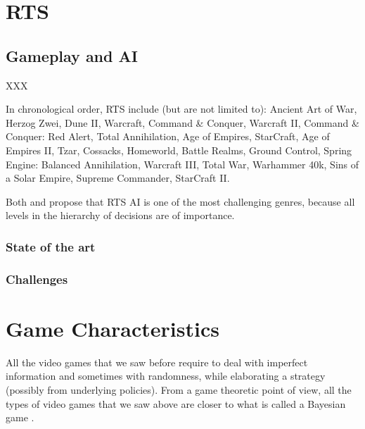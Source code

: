 

\section{RTS}

\subsection{Gameplay and AI}
XXX 

In chronological order, RTS include (but are not limited to): Ancient Art of War, Herzog Zwei, Dune II, Warcraft, Command \& Conquer, Warcraft II, Command \& Conquer: Red Alert, Total Annihilation, Age of Empires, StarCraft, Age of Empires II, Tzar, Cossacks, Homeworld, Battle Realms, Ground Control, Spring Engine: Balanced Annihilation, Warcraft III, Total War, Warhammer 40k, Sins of a Solar Empire, Supreme Commander, StarCraft II.

Both \citep{Human-LevelAIKillerApplication} and \cite{gunn} propose that RTS AI is one of the most challenging genres, because all levels in the hierarchy of decisions are of importance.

\subsubsection{State of the art}

\subsubsection{Challenges}


\section{Game Characteristics}
All the video games that we saw before require to deal with imperfect information and sometimes with randomness, while elaborating a strategy (possibly from underlying policies). From a game theoretic point of view, all the types of video games that we saw above are closer to what is called a Bayesian game \citep{osborne-rubinstein}. %

